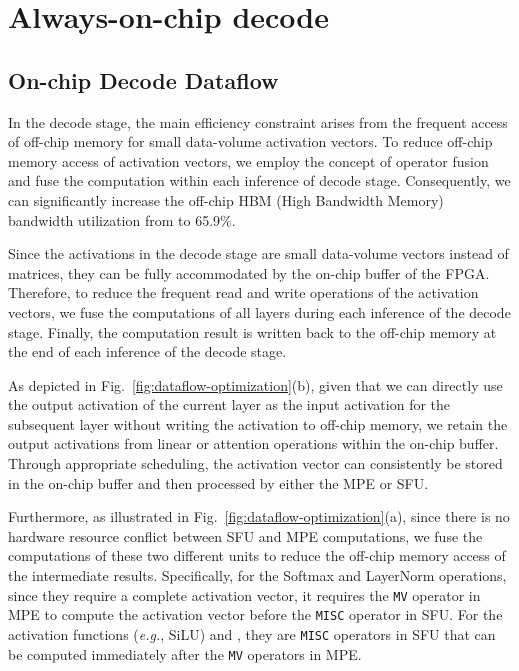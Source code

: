 \section{Always-on-chip decode}

\subsection{On-chip Decode Dataflow}

In the decode stage, the main efficiency constraint arises from the frequent access of off-chip memory for small data-volume activation vectors.
To reduce off-chip memory access of activation vectors, we employ the concept of operator fusion and fuse the computation within each inference of decode stage. 
Consequently, we can significantly increase the off-chip HBM (High Bandwidth Memory) bandwidth utilization from  to 65.9\%. 



Since the activations in the decode stage are small data-volume vectors instead of matrices, they can be fully accommodated by the on-chip buffer of the FPGA. 
Therefore, to reduce the frequent read and write operations of the activation vectors, we fuse the computations of all layers during each inference of the decode stage. 
Finally, the computation result is written back to the off-chip memory at the end of each inference of the decode stage. 

As depicted in Fig.~\ref{fig:dataflow-optimization}(b), given that we can directly use the output activation of the current layer as the input activation for the subsequent layer without writing the activation to off-chip memory, we retain the output activations from linear or attention operations within the on-chip buffer.
Through appropriate scheduling, the activation vector can consistently be stored in the on-chip buffer and then processed by either the MPE or SFU.

Furthermore, as illustrated in Fig.~\ref{fig:dataflow-optimization}(a), since there is no hardware resource conflict between SFU and MPE computations, we fuse the computations of these two different units to reduce the off-chip memory access of the intermediate results. 
Specifically, for the Softmax and LayerNorm operations, since they require a complete activation vector, it requires the \texttt{MV} operator in MPE to compute the activation vector before the \texttt{MISC} operator in SFU. For the activation functions (\textit{e.g.}, SiLU) and , they are \texttt{MISC} operators in SFU that can be computed immediately after the \texttt{MV} operators in MPE.


